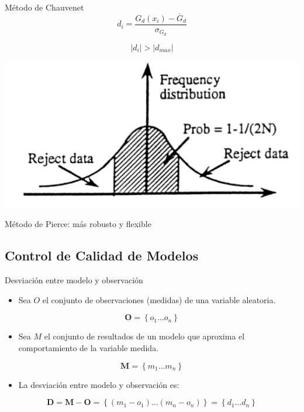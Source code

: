 \documentclass[xcolor={usenames,svgnames,dvipsnames}]{beamer}
\begin{document}
\begin{frame}[label={sec:org74f3a18}]{Método de Chauvenet}
\[
d_i = \frac{G_d(x_i) - \overline{G}_d}{\sigma_{G_d}}
\]

\[
\left| d_i \right| > \left| d_{max} \right|
\]

\begin{center}
\begin{center}
\includegraphics[width=.9\linewidth]{../figs/chauvenet.png}
\end{center}
\end{center}

\begin{block}{Método de Pierce: más robusto y flexible \nocite{Ross2003}}
\end{block}
\end{frame}

\subsection{Control de Calidad de Modelos}
\label{sec:orga362cfa}

\begin{frame}[label={sec:orgcee0d35}]{Desviación entre modelo y observación}
\begin{itemize}
\item Sea \(O\) el conjunto de observaciones (medidas) de una variable aleatoria.
\end{itemize}

\[
\mathbf{O} = \left\{ o_1 \dots o_n \right\}
\]
\begin{itemize}
\item Sea \(M\) el conjunto de resultados de un modelo que aproxima el comportamiento de la variable medida.
\end{itemize}

\[
\mathbf{M} = \left\{ m_1 \dots m_n  \right\}
\]

\begin{itemize}
\item La desviación entre modelo y observación es:
\end{itemize}

\[
\mathbf{D} = \mathbf{M} - \mathbf{O} =  \left\{ (m_1 - o_1) \dots (m_n - o_n)  \right\} = \left\{ d_1 \dots d_n  \right\}
\]
\end{frame}
\end{document}
